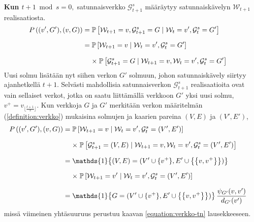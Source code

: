 \documentclass[finnish, 12pt, a4paper, sci, utf8, pdfa]{aaltothesis}
\newcommand{\Grandom}{\mathcal{G}}
\newcommand{\Wrandom}{\mathcal{W}}
\newcommand{\indicator}{\mathopen{\mathds{1}}}
\newcommand*{\prob}{\mathbb{P}}
\begin{document}
{\vspace{0.5cm}

\textbf{Kun $ t + 1 \bmod s = 0, $} satunnaisverkko $ \Grandom^{s}_{t+1} $ määräytyy satunnaiskävelyn $ \Wrandom_{t+1} $ realisaatiosta.
\begin{equation*}
   \setlength{\jot}{10pt}
   \begin{aligned}
   P\left( (v', G'), (v, G) \right) &= \prob \left[ \Wrandom_{t+1} = v, \Grandom^{s}_{t+1} = G \mid \Wrandom_{t} = v', \Grandom^{s}_{t} = G' \right] \\
   &= \prob \left[ \Wrandom_{t+1} = v \mid \Wrandom_{t} = v', \Grandom^{s}_{t} = G' \right] \\
   &\mathrel{\phantom{=}} \times \; \prob \left[ \Grandom^{s}_{t+1} = G \mid \Wrandom_{t+1} = v, \Wrandom_{t} = v', \Grandom^{s}_{t} = G' \right]
   \end{aligned}
\end{equation*}
Uusi solmu lisätään nyt siihen verkon $ G' $ solmuun, johon satunnaiskävely siirtyy ajanhetkellä $ t + 1 $. Selvästi mahdollisia satunnaisverkon $ \Grandom^{s}_{t+1} $ realisaatioita ovat vain sellaiset verkot, jotka on saatu liittämällä verkkoon $ G' $ yksi uusi solmu, $ v^{+} = v_{\lfloor \frac{t+1}{s} \rfloor} $. Kun verkkoja $ G $ ja $ G' $ merkitään verkon määritelmän (\ref{definition:verkko}) mukaisina solmujen ja kaarien pareina $ (V, E) $ ja $ (V', E') $,
\begin{equation*}
   \setlength{\jot}{10pt}
   \begin{aligned}
   P\left( (v', G'), (v, G) \right) &= \prob \left[ \Wrandom_{t+1} = v \mid \Wrandom_{t} = v', \Grandom^{s}_{t} = (V', E') \right] \\
           &\mathrel{\phantom{=}} \times \; \prob \left[ \Grandom^{s}_{t+1} = (V, E) \mid \Wrandom_{t+1} = v, \Wrandom_{t} = v', \Grandom^{s}_{t} = (V', E') \right] \\
           &= \indicator \left\{ (V, E) = (V' \cup \{ v^{+} \}, E' \cup \left\{ \left\{ v, v^{+} \right\} \right\}) \right\} \\
           &\mathrel{\phantom{=}} \times \; \prob \left[ \Wrandom_{t+1} = v' \mid \Wrandom_{t} = v', \Grandom^{s}_{t} = (V', E') \right] \\
           &= \indicator \left\{ G = (V' \cup \{ v^{+} \}, E' \cup \left\{ \left\{ v, v^{+} \right\} \right\}) \right\} \frac{\psi_{G'}(v, v')}{d_{G'}(v')}
   \end{aligned}
\end{equation*}
missä viimeinen yhtäsuuruus perustuu kaavan \ref{equation:verkko-tn} lausekkeeseen.
}
\end{document}
